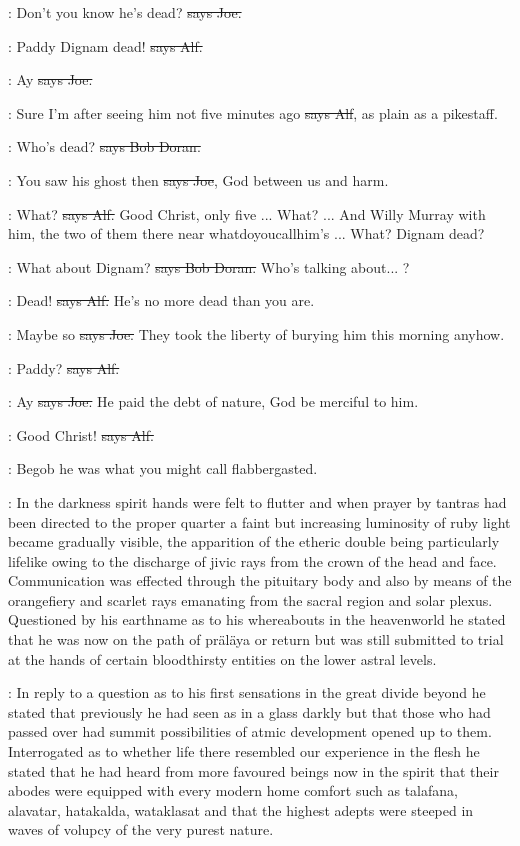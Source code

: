 \joe:
Don't you know he's dead?
\sout{says Joe.}

\bergan:
Paddy Dignam dead!
\sout{says Alf.}

\joe:
Ay
\sout{says Joe.}

\bergan:
Sure I'm after seeing him not five minutes ago
\sout{says Alf},
as plain as a pikestaff.

\doran:
Who's dead?
\sout{says Bob Doran.}

\joe:
You saw his ghost then
\sout{says Joe},
God between us and harm.

\bergan:
What?
\sout{says Alf.} Good Christ,
only five ...
What?
...
And Willy Murray
with him,
the two of them there near whatdoyoucallhim's ...
What?
Dignam dead?

\doran:
What about Dignam?
\sout{says Bob Doran.}
Who's talking about...
?

\bergan:
Dead!
\sout{says Alf.}
He's no more dead than you are.

\joe:
Maybe so
\sout{says Joe.}
They took the liberty of burying him this morning
anyhow.

\bergan:
Paddy?
\sout{says Alf.}

\joe:
Ay
\sout{says Joe.}
He paid the debt of nature,
God be merciful to him.

\bergan:
Good Christ!
\sout{says Alf.}

\Nq:
Begob he was what you might call flabbergasted.

:
In the darkness spirit hands were felt to flutter and when prayer by
tantras had been directed to the proper quarter a faint but increasing
luminosity of ruby light became gradually visible,
the apparition of the
etheric double being particularly lifelike owing to the discharge of jivic
rays from the crown of the head and face.
Communication was effected
through the pituitary body and also by means of the orangefiery and
scarlet rays emanating from the sacral region and solar plexus.
Questioned
by his earthname as to his whereabouts in the heavenworld he stated that
he was now on the path of präläya or return but was still submitted to
trial at the hands of certain bloodthirsty entities on the lower astral
levels.

:
In reply to a question as to his first sensations in the great
divide beyond he stated that previously he had seen as in a glass darkly
but that those who had passed over
had summit possibilities of atmic
development opened up to them.
Interrogated as to whether life there
resembled our experience in the flesh he stated that he had heard from
more favoured beings now in the spirit that their abodes were equipped
with every modern home comfort such as talafana,
alavatar,
hatakalda,
wataklasat and that the highest adepts were steeped in waves of volupcy
of the very purest nature.

